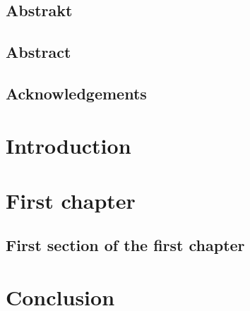 \documentclass[12pt,a4paper]{report}
\begin{document}
\eject %


%

\eject

%

\eject

\section*{Abstrakt}


\eject

\section*{Abstract}


\eject

\section*{Acknowledgements}


\eject

\tableofcontents

\listoffigures
\listoftables

\chapter*{Introduction}
\setcounter{page}{1}
\label{chapter:intro}


\chapter{First chapter}
\label{chapter:first}

\section{First section of the first chapter}
\label{section:online}


\chapter*{Conclusion}
\label{chapter:conclusion}



\printbibliography

\appendix

%
\end{document}
